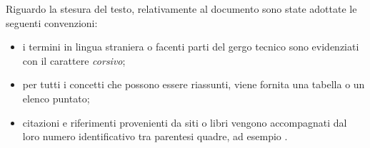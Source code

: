 Riguardo la stesura del testo, relativamente al documento sono state adottate le seguenti convenzioni:
\begin{itemize}
	\item i termini in lingua straniera o facenti parti del gergo tecnico sono evidenziati con il carattere \emph{corsivo};
	\item per tutti i concetti che possono essere riassunti, viene fornita una tabella o un elenco puntato;
	\item citazioni e riferimenti provenienti da siti o libri vengono accompagnati dal loro numero identificativo tra parentesi quadre, ad esempio \cite{site:junit-annotation}.
\end{itemize}